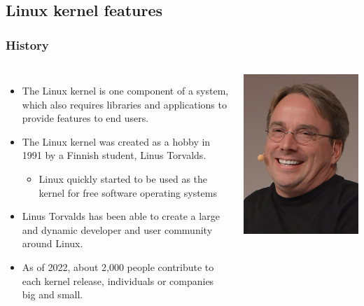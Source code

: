 \subsection{Linux kernel features}

\begin{frame}
  \frametitle{History}
  \begin{columns}
    \begin{itemize}
    \item The Linux kernel is one component of a system, which also
      requires libraries and applications to provide features to end
      users.
    \item The Linux kernel was created as a hobby in 1991 by a Finnish
      student, Linus Torvalds.
      \begin{itemize}
      \item Linux quickly started to be used as the kernel for free
        software operating systems
      \end{itemize}
    \item Linus Torvalds has been able to create a large and dynamic
      developer and user community around Linux.
    \item As of 2022, about 2,000 people contribute to each kernel
      release, individuals or companies big and small.
    \end{itemize}
      \includegraphics[width=\textwidth]{slides/sysdev-linux-intro-features/linus-torvalds.jpg}

\end{columns}
\end{frame}
